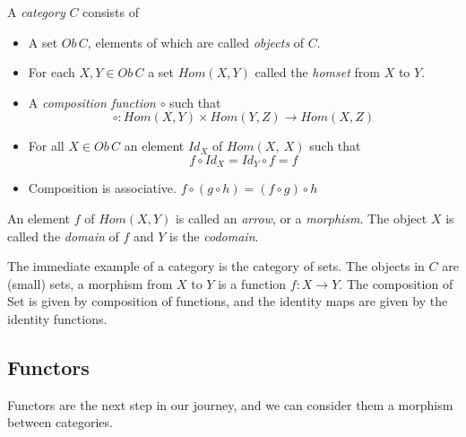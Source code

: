 \begin{definition}
    A \textit{category} $C$ consists of
    \begin{itemize}
        \item A set $Ob\,C$, elements of which are called \textit{objects} of $C$.
        \item For each $X, Y \in Ob\,C$
            a set $Hom(X,Y)$ called the \textit{homset} from $X$ to $Y$.
        \item A \textit{composition function} $\circ$ such that
            \begin{equation}
                \circ : Hom(X,Y) \times Hom(Y,Z) \rightarrow Hom(X,Z)
            \end{equation}
        \item For all $X \in Ob\,C$ an element $Id_X$ of $Hom(X,\ X)$ such that
            \begin{equation}
            f \circ Id_X = Id_Y \circ f = f
            \end{equation}
        \item Composition is associative.  $f \circ (g \circ h) = (f \circ g) \circ h$
    \end{itemize}
\end{definition}

\par
An element $f$ of $Hom(X,Y)$ is called an \textit{arrow},
or a \textit{morphism}. The object $X$ is called the \textit{domain} of $f$ and $Y$ is
the \textit{codomain}.\\

\begin{example}
    The immediate example of a category is the category of sets.
    The objects in $C$ are (small) sets,
    a morphism from $X$ to $Y$ is a function $f : X \rightarrow Y$.
    The composition of Set is given by composition of functions,
    and the identity maps are given by the identity functions.
\end{example}

\subsection{Functors}
Functors are the next step in our journey,
and we can consider them a morphism between categories.\\


